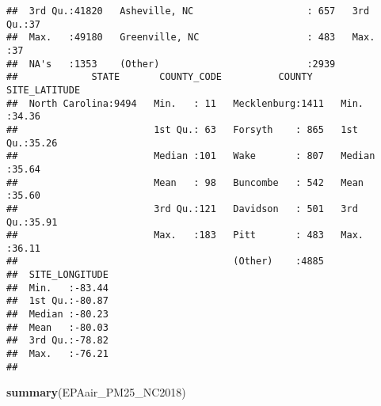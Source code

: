 \documentclass[]{article}
\newenvironment{Shaded}{\begin{snugshade}}{\end{snugshade}}
\newcommand{\KeywordTok}[1]{\textcolor[rgb]{0.13,0.29,0.53}{\textbf{#1}}}
\newcommand{\NormalTok}[1]{#1}
\begin{document}
\begin{verbatim}
##  3rd Qu.:41820   Asheville, NC                    : 657   3rd Qu.:37  
##  Max.   :49180   Greenville, NC                   : 483   Max.   :37  
##  NA's   :1353    (Other)                          :2939               
##             STATE       COUNTY_CODE          COUNTY     SITE_LATITUDE  
##  North Carolina:9494   Min.   : 11   Mecklenburg:1411   Min.   :34.36  
##                        1st Qu.: 63   Forsyth    : 865   1st Qu.:35.26  
##                        Median :101   Wake       : 807   Median :35.64  
##                        Mean   : 98   Buncombe   : 542   Mean   :35.60  
##                        3rd Qu.:121   Davidson   : 501   3rd Qu.:35.91  
##                        Max.   :183   Pitt       : 483   Max.   :36.11  
##                                      (Other)    :4885                  
##  SITE_LONGITUDE  
##  Min.   :-83.44  
##  1st Qu.:-80.87  
##  Median :-80.23  
##  Mean   :-80.03  
##  3rd Qu.:-78.82  
##  Max.   :-76.21  
## 
\end{verbatim}

\begin{Shaded}
\begin{Highlighting}[]
\KeywordTok{summary}\NormalTok{(EPAair_PM25_NC2018)}
\end{Highlighting}
\end{Shaded}
\end{document}
